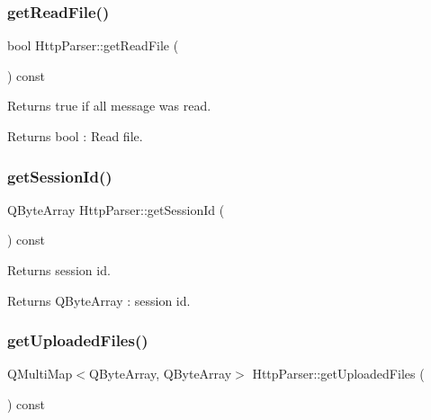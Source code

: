 \subsubsection{\texorpdfstring{get\+Read\+File()}{getReadFile()}}
{\footnotesize\ttfamily bool Http\+Parser\+::get\+Read\+File (\begin{DoxyParamCaption}{ }\end{DoxyParamCaption}) const\hspace{0.3cm}{\ttfamily [inline]}}



Returns true if all message was read. 

\begin{DoxyReturn}{Returns}
bool \+: Read file. 
\end{DoxyReturn}
\mbox{\label{class_http_parser_a60292a9b49d1e86becec848c3d0541bc}} 
\subsubsection{\texorpdfstring{get\+Session\+Id()}{getSessionId()}}
{\footnotesize\ttfamily Q\+Byte\+Array Http\+Parser\+::get\+Session\+Id (\begin{DoxyParamCaption}{ }\end{DoxyParamCaption}) const\hspace{0.3cm}{\ttfamily [inline]}}



Returns session id. 

\begin{DoxyReturn}{Returns}
Q\+Byte\+Array \+: session id. 
\end{DoxyReturn}
\mbox{\label{class_http_parser_a502683ab11ae1eacec0bcdd0398c6bdd}} 
\subsubsection{\texorpdfstring{get\+Uploaded\+Files()}{getUploadedFiles()}}
{\footnotesize\ttfamily Q\+Multi\+Map$<$Q\+Byte\+Array, Q\+Byte\+Array$>$ Http\+Parser\+::get\+Uploaded\+Files (\begin{DoxyParamCaption}{ }\end{DoxyParamCaption}) const\hspace{0.3cm}{\ttfamily [inline]}}




